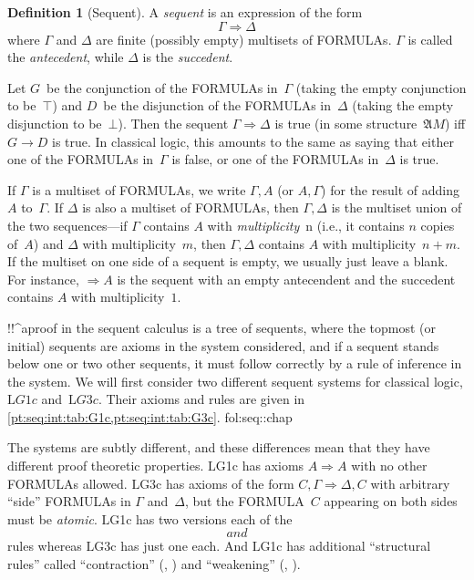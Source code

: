 \documentclass[10pt,a4paper]{article}
\makeatletter
\newcommand*{\olup}[1]{\MakeUppercase{#1}}
\theoremstyle{plain}
\theoremstyle{definition}
\newtheorem{defn}[thm]{Definition}
\theoremstyle{remark}
\newcommand{\olref}{\@ifnextchar[{\olref@i}{\olref@final}}
\def\olref@i[#1]{\@ifnextchar[{\olref@ii}{\olref@final}}
\def\olref@ii[#1]{\@ifnextchar[{\olref@iii}{\olref@final}}
\def\olref@iii[#1]{\olref@final}
\def\olref@final#1{\ref{#1}}
\providecommand{\lif}{\mathbin{\rightarrow}}
\providecommand{\ltrue}{\top}
\providecommand{\lfalse}{\bot}
\providecommand{\Sequent}{\mathrel{\Rightarrow}}
\providecommand{\Struct}{\ensuremath{\mathfrak{A}}}
\providecommand{\Log}{\ensuremath{\mathrm{L}}}
\providecommand{\LeftR}[1]{}
\providecommand{\RightR}[1]{}
\providecommand{\oliflabeldef}[3]{#1}
\providecommand{\cref}[1]{\ref{#1}}
\providecommand{\Weakening}{\mathrm{Wk}}
\providecommand{\RightR}{\mathrm{R}}
\providecommand{\LeftR}{\mathrm{L}}
\providecommand{\Contraction}{\mathrm{C}}
\makeatother
\begin{document}
\begin{defn}[Sequent]
A \emph{sequent} is an expression of the form
\[
\Gamma \Sequent \Delta
\]
where $\Gamma$ and $\Delta$ are finite (possibly empty) multisets of
\olup{formula}s. $\Gamma$ is called the \emph{antecedent}, while
$\Delta$ is the \emph{succedent}.
\end{defn}

Let $G$~be the conjunction of the \olup{formula}s in~$\Gamma$ (taking
the empty conjunction to be~$\ltrue$) and $D$~be the disjunction of
the \olup{formula}s in~$\Delta$ (taking the empty disjunction to
be~$\lfalse$). Then the sequent $\Gamma \Sequent \Delta$ is true (in
some structure~$\Struct{M}$) iff $G \lif D$ is true. In classical
logic, this amounts to the same as saying that either one of the
\olup{formula}s in~$\Gamma$ is false, or one of the \olup{formula}s
in~$\Delta$ is true.

If $\Gamma$ is a multiset of \olup{formula}s, we write $\Gamma, A$ (or
$A, \Gamma$) for the result of adding $A$ to~$\Gamma$. If $\Delta$
is also a multiset of \olup{formula}s, then $\Gamma, \Delta$ is the
multiset union of the two sequences---if $\Gamma$ contains $A$ with
\emph{multiplicity}~n (i.e., it contains $n$ copies of~$A$) and
$\Delta$ with multiplicity~$m$, then $\Gamma, \Delta$ contains $A$
with multiplicity~$n+m$. If the multiset on one side of a sequent is
empty, we usually just leave a blank. For instance, $\Sequent A$ is
the sequent with an empty antecendent and the succedent contains $A$
with multiplicity~$1$.

!!^a{proof} in the sequent calculus is a tree of sequents, where
the topmost (or initial) sequents are axioms in the system considered,
and if a sequent stands below one or two other sequents, it must
follow correctly by a rule of inference in the system. We will first
consider two different sequent systems for classical logic,
$\Log{G1c}$ and~$\Log{G3c}$. Their axioms and rules are given in
\cref{pt:seq:int:tab:G1c,pt:seq:int:tab:G3c}. \oliflabeldef{fol:seq::chap}{ (Gentzen's
original system \Log{LK} is described in \olref[fol][seq][]{chap}.)}{}




The systems are subtly different, and these differences mean that they
have different proof theoretic properties. \Log{G1c} has axioms $A
\Sequent A$ with no other \olup{formula}s allowed. \Log{G3c} has axioms
of the form $C, \Gamma \Sequent \Delta, C$ with arbitrary ``side''
\olup{formula}s in $\Gamma$ and~$\Delta$, but the \olup{formula}~$C$
appearing on both sides must be \emph{atomic}. \Log{G1c} has two versions
each of the $\LeftR{\land}$ and $\RightR{\lor}$ rules whereas \Log{G3c}
has just one each. And \Log{G1c} has additional ``structural rules''
called ``contraction'' (\LeftR{\Contraction}, \RightR{\Contraction})
and ``weakening'' (\LeftR{\Weakening}, \RightR{\Weakening}).
\end{document}
